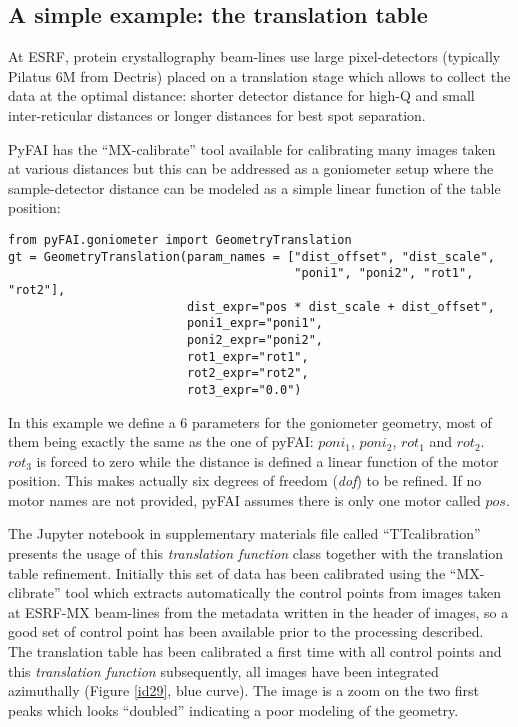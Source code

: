 \documentclass[preprint, pdf]{iucr}              %
\begin{document}
\subsection{A simple example: the translation table}

At ESRF, protein crystallography beam-lines use large pixel-detectors (typically
Pilatus 6M from Dectris) placed on a translation stage which allows to collect
the data at the optimal distance: shorter detector distance for high-Q and small
inter-reticular distances or longer distances for best spot separation.

PyFAI has the ``MX-calibrate'' tool available for calibrating many images taken
at various distances but this can be addressed as a goniometer setup where the
sample-detector distance can be modeled as a simple linear function of the table
position:

\begin{verbatim}
from pyFAI.goniometer import GeometryTranslation
gt = GeometryTranslation(param_names = ["dist_offset", "dist_scale",
                                        "poni1", "poni2", "rot1", "rot2"],
                         dist_expr="pos * dist_scale + dist_offset",
                         poni1_expr="poni1",
                         poni2_expr="poni2",
                         rot1_expr="rot1",
                         rot2_expr="rot2",
                         rot3_expr="0.0")
\end{verbatim}

In this example we define a 6 parameters for the goniometer geometry, most of
them being exactly the same as the one of pyFAI: $poni_1$, $poni_2$, $rot_1$
and $rot_2$. $rot_3$ is forced to zero while the distance is defined a
linear function of the motor position.
This makes actually six degrees of freedom  (\textit{dof}) to be refined.
If no motor names are not provided, pyFAI assumes there is only one motor
called $pos$.

The Jupyter notebook \cite{ipython} in supplementary materials file called
``TTcalibration'' presents the usage of this \textit{translation function} class
together with the translation table refinement.
Initially this set of data has been calibrated using the ``MX-clibrate'' tool
which extracts automatically the control points from images taken at ESRF-MX
beam-lines from the metadata written in the header of images, so a good set
of control point has been available prior to the processing described.
The translation table has been calibrated a first time with all control points
and this \textit{translation function} subsequently, all images have been
integrated azimuthally (Figure \ref{id29}, blue curve).
The image is a zoom on the two first peaks which looks ``doubled'' indicating a
poor modeling of the geometry.
\end{document}
